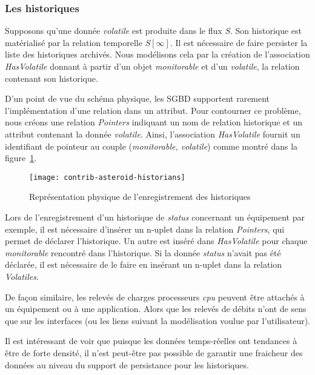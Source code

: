 \subsubsection{Les historiques}
Supposons qu'une donnée \textit{volatile} est produite dans le flux $S$. Son historique est matérialisé par la relation temporelle $S[\infty]$. Il est nécessaire de faire persister la liste des historiques archivés. Nous modélisons cela par la création de l'association \textit{HasVolatile} donnant à partir d'un objet \textit{monitorable} et d'un \textit{volatile}, la relation contenant son historique.

D'un point de vue du schéma physique, les SGBD supportent rarement l'implémentation d'une relation dans un attribut. Pour contourner ce problème, nous créons une relation \textit{Pointers} indiquant un nom de relation historique et un attribut contenant la donnée \textit{volatile}. Ainsi, l'association \textit{HasVolatile} fournit un identifiant de pointeur au couple (\textit{monitorable, volatile}) comme montré dans la figure~\ref{fig:contrib:asteroid:theorie:volatile}.

\begin{figure}[ht]
    \centering
    \texttt{[image: contrib-asteroid-historians]}
    \caption{Représentation physique de l'enregistrement des historiques}\label{fig:contrib:asteroid:theorie:volatile}
\end{figure}

\begin{example}
	Lors de l'enregistrement d'un historique de \textit{status} concernant un équipement par exemple, il est nécessaire d'insérer un n-uplet dans la relation \textit{Pointers}, qui permet de déclarer l'historique. Un autre est inséré dans \textit{HasVolatile} pour chaque \textit{monitorable} rencontré dans l'historique. Si la donnée \textit{status} n'avait pas été déclarée, il est nécessaire de le faire en insérant un n-uplet dans la relation \textit{Volatiles}.
	
	De façon similaire, les relevés de charges processeurs \textit{cpu} peuvent être attachés à un équipement ou à une application. Alors que les relevés de débits n'ont de sens que sur les interfaces (ou les liens suivant la modélisation voulue par l'utilisateur).
\end{example}

Il est intéressant de voir que puisque les données temps-réelles ont tendances à être de forte densité, il n'est peut-être pas possible de garantir une fraicheur des données au niveau du support de persistance pour les historiques.

